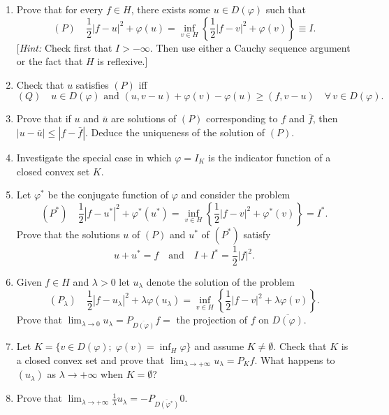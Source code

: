 \documentclass[12pt]{article}
\newcommand{\abs}[1]{\left|#1\right|}
\begin{document}
\begin{enumerate}
\item Prove that for every $f \in H$, there exists some $u \in D(\varphi)$ such that
\[
(P)\quad \frac{1}{2}\abs{f - u}^2 + \varphi(u) = \inf_{v \in H}\left\{\frac{1}{2}\abs{f-v}^2 + \varphi(v)\right\} \equiv I.
\]
[\textit{Hint:} Check first that $I > -\infty$. Then use either a Cauchy sequence argument
or the fact that $H$ is reflexive.]
 
\item Check that $u$ satisfies $(P)$ iff
\[
(Q)\quad u \in D(\varphi) \text{ and } (u, v-u) + \varphi(v) - \varphi(u) \ge (f, v-u) \quad \forall\, v \in D(\varphi).
\]
 
\item Prove that if $u$ and $\bar{u}$ are solutions of $(P)$ corresponding to $f$ and $\bar{f}$, then
$\abs{u - \bar{u}} \le \abs{f - \bar{f}}$. Deduce the uniqueness of the solution of $(P)$.
 
\item Investigate the special case in which $\varphi = I_K$ is the indicator function of a closed
convex set $K$.
 
\item Let $\varphi^*$ be the conjugate function of $\varphi$ and consider the problem
\[
(P^*)\quad \frac{1}{2}\abs{f - u^*}^2 + \varphi^*(u^*) = \inf_{v \in H}\left\{\frac{1}{2}\abs{f-v}^2 + \varphi^*(v)\right\} = I^*.
\]
Prove that the solutions $u$ of $(P)$ and $u^*$ of $(P^*)$ satisfy
\[
u + u^* = f \quad \text{and} \quad I + I^* = \frac{1}{2}\abs{f}^2.
\]
 
\item Given $f \in H$ and $\lambda > 0$ let $u_\lambda$ denote the solution of the problem
\[
(P_\lambda)\quad \frac{1}{2}\abs{f - u_\lambda}^2 + \lambda\varphi(u_\lambda) = \inf_{v \in H}\left\{\frac{1}{2}\abs{f-v}^2 + \lambda\varphi(v)\right\}.
\]
Prove that $\lim_{\lambda\to 0} u_\lambda = P_{\overline{D(\varphi)}} f =$ the projection of $f$ on $\overline{D(\varphi)}$.
 
 
\item Let $K = \{v \in D(\varphi);\; \varphi(v) = \inf_H \varphi\}$ and assume $K \neq \emptyset$.
Check that $K$ is a closed convex set and prove that $\lim_{\lambda\to+\infty} u_\lambda = P_K f$.
What happens to $(u_\lambda)$ as $\lambda \to +\infty$ when $K = \emptyset$?
 
\item Prove that $\lim_{\lambda\to+\infty} \frac{1}{\lambda} u_\lambda = -P_{\overline{D(\varphi^*)}} 0$.
 
\noindent[\textit{Hint:} Start with the case where $f = 0$ and apply questions 5 and 6.]
\end{enumerate}
 
\end{document}
